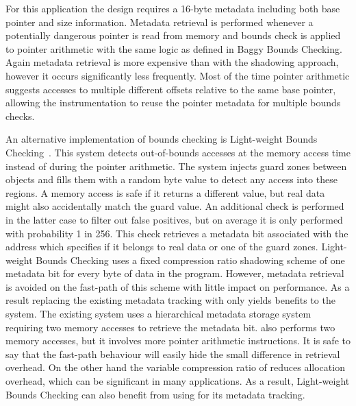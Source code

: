 For this application the design requires a 16-byte metadata including both base pointer and size information.
Metadata retrieval is performed whenever a potentially dangerous pointer is read from memory and bounds check is applied to
pointer arithmetic with the same logic as defined in Baggy Bounds Checking. Again metadata retrieval is more expensive than with
the shadowing approach, however it occurs significantly less frequently. Most of the time pointer arithmetic suggests accesses to
multiple different offsets relative to the same base pointer, allowing the instrumentation to reuse the pointer metadata for multiple
bounds checks.

An alternative implementation of bounds checking is Light-weight Bounds Checking~\cite{hasabnis2012light}. 
This system detects out-of-bounds accesses at the memory access time
instead of during the pointer arithmetic. The system injects guard zones between objects
and fills them with a random byte value to detect any access into these regions. 
A memory access is safe if it returns a different value, but real data might also
accidentally match the guard value. An additional check is performed in
the latter case to filter out false positives, but on average it is only performed
with probability 1 in 256. This check retrieves a metadata bit associated with
the address which specifies if it belongs to real data or one of the guard zones.
Light-weight Bounds Checking uses a fixed compression ratio shadowing
scheme of one metadata bit for every byte of data in the program.
However, metadata retrieval is avoided on the fast-path of this scheme
with little impact on performance. As a result replacing the existing
metadata tracking with \projectname{} only yields benefits to the system.
The existing system uses a hierarchical metadata storage system requiring
two memory accesses to retrieve the metadata bit. \projectname{} also performs two
memory accesses, but it involves more pointer arithmetic instructions.
It is safe to say that the fast-path behaviour will easily hide the small difference
in retrieval overhead. On the other hand the variable compression ratio of \projectname{} reduces allocation overhead,
which can be significant in many applications. As a result,  Light-weight Bounds Checking can also benefit from using \projectname{} for its metadata tracking.

